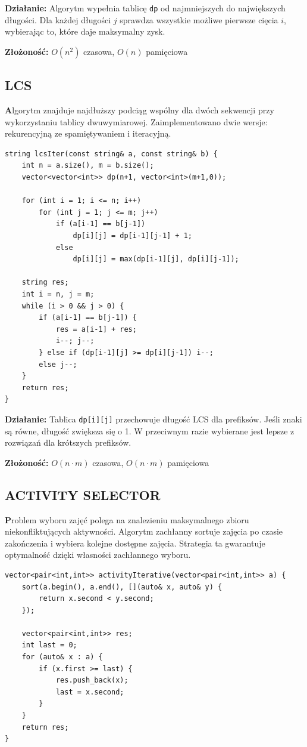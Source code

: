 \documentclass[11pt,a4paper]{article}
\begin{document}
\textbf{Działanie:} Algorytm wypełnia tablicę \texttt{dp} od najmniejszych do największych długości. Dla każdej długości $j$ sprawdza wszystkie możliwe pierwsze cięcia $i$, wybierając to, które daje maksymalny zysk. 

\textbf{Złożoność:} $O(n^2)$ czasowa, $O(n)$ pamięciowa

\subsection{LCS}
\textbf Algorytm znajduje najdłuższy podciąg wspólny dla dwóch sekwencji przy wykorzystaniu tablicy dwuwymiarowej. Zaimplementowano dwie wersje: rekurencyjną ze spamiętywaniem i iteracyjną.

\begin{lstlisting}[caption={LCS – wersja iteracyjna}]
string lcsIter(const string& a, const string& b) {
    int n = a.size(), m = b.size();
    vector<vector<int>> dp(n+1, vector<int>(m+1,0));
    
    for (int i = 1; i <= n; i++)
        for (int j = 1; j <= m; j++)
            if (a[i-1] == b[j-1])
                dp[i][j] = dp[i-1][j-1] + 1;
            else
                dp[i][j] = max(dp[i-1][j], dp[i][j-1]);
    
    string res;
    int i = n, j = m;
    while (i > 0 && j > 0) {
        if (a[i-1] == b[j-1]) {
            res = a[i-1] + res;
            i--; j--;
        } else if (dp[i-1][j] >= dp[i][j-1]) i--;
        else j--;
    }
    return res;
}
\end{lstlisting}

\textbf{Działanie:} Tablica \texttt{dp[i][j]} przechowuje długość LCS dla prefiksów. Jeśli znaki są równe, długość zwiększa się o 1. W przeciwnym razie wybierane jest lepsze z rozwiązań dla krótszych prefiksów.

\textbf{Złożoność:} $O(n \cdot m)$ czasowa, $O(n \cdot m)$ pamięciowa

\subsection{ACTIVITY SELECTOR}
\textbf Problem wyboru zajęć polega na znalezieniu maksymalnego zbioru niekonfliktujących aktywności. Algorytm zachłanny sortuje zajęcia po czasie zakończenia i wybiera kolejne dostępne zajęcia. Strategia ta gwarantuje optymalność dzięki własności zachłannego wyboru.

\begin{lstlisting}[caption={ACTIVITY SELECTOR – wersja zachłanna}]
vector<pair<int,int>> activityIterative(vector<pair<int,int>> a) {
    sort(a.begin(), a.end(), [](auto& x, auto& y) {
        return x.second < y.second;
    });

    vector<pair<int,int>> res;
    int last = 0;
    for (auto& x : a) {
        if (x.first >= last) {
            res.push_back(x);
            last = x.second;
        }
    }
    return res;
}
\end{lstlisting}
\end{document}
